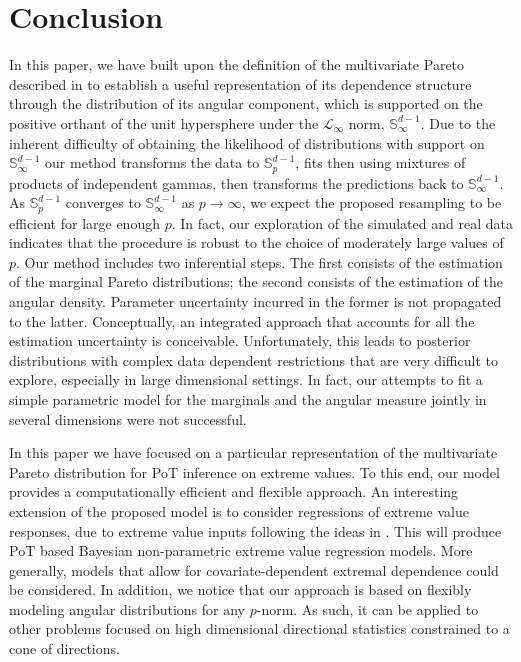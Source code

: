 \section{Conclusion\label{sec:conclusion}}
In this paper, we have built upon the definition of the multivariate Pareto 
    described in \cite{ferreira2014} to establish a useful representation of 
    its dependence structure through the distribution of its angular component,
    which is supported on the positive orthant of the unit hypersphere under 
    the $\mathcal{L}_{\infty}$ norm, $\mathbb{S}_{\infty}^{d-1}$.
    Due to the inherent difficulty of 
    obtaining the likelihood of distributions with support on ${\mathbb S}^{d-1}_\infty$ 
    our method transforms the data to ${\mathbb S}_{p}^{d-1}$, fits then using mixtures of 
    products of independent gammas, then transforms the predictions back to 
    ${\mathbb S}^{d-1}_\infty$. As ${\mathbb S}_{p}^{d-1}$ converges to 
    ${\mathbb S}_{\infty}^{d-1}$ as  $p\to\infty$, we expect the proposed 
    resampling to be efficient for large enough $p$. In fact, our exploration 
    of the simulated and real data indicates that the procedure is robust to 
    the choice of moderately large values of $p$.
    Our method includes two inferential steps. The first consists of the
    estimation of the marginal Pareto distributions; the second consists 
    of the estimation of the angular density. Parameter uncertainty incurred in
    the former is not propagated to the latter. Conceptually, an integrated approach 
    that accounts for all the estimation uncertainty is conceivable. Unfortunately, 
    this leads to posterior distributions with complex data dependent restrictions 
    that are very difficult to explore, especially in large dimensional settings. In 
    fact, our attempts to fit a simple parametric model for the marginals and the
    angular measure jointly in several dimensions were not successful.

In this paper we have focused on a particular representation of the multivariate
    Pareto distribution for PoT inference on extreme values. To this end, our model 
    provides a computationally efficient and flexible approach. An interesting extension
    of the proposed model is to consider regressions of extreme value responses, due
    to extreme value inputs following the ideas in  \cite{carvalho2022}. This will 
    produce PoT based Bayesian non-parametric extreme value regression models. More 
    generally,  models that allow for covariate-dependent extremal dependence 
    \citep{mhalla2019} could be considered. In addition, we notice that our approach 
    is based on flexibly  modeling angular distributions for any $p$-norm. As such, 
    it can be applied to other problems focused on high dimensional directional 
    statistics  constrained  to a cone of directions. 

